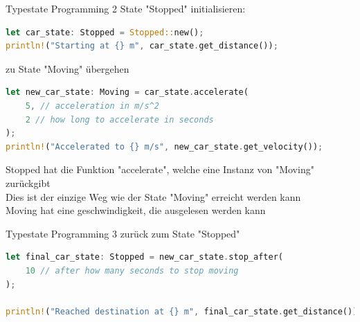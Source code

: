 \begin{frame}[fragile,t]{Typestate Programming 2}
    State "Stopped" initialisieren:
    \begin{lstlisting}[language=Rust,escapechar=@,label={lst:typestate-programming-2-1}]
let car_state: Stopped = Stopped::new();
println!("Starting at {} m", car_state.get_distance());
\end{lstlisting}


    \pause zu State "Moving" übergehen
    \begin{lstlisting}[language=Rust,escapechar=@,label={lst:typestate-programming-2-2}]
let new_car_state: Moving = car_state.accelerate(
    5, // acceleration in m/s^2
    2 // how long to accelerate in seconds
);
println!("Accelerated to {} m/s", new_car_state.get_velocity());
\end{lstlisting}

     {
        Stopped hat die Funktion "accelerate", welche eine Instanz von "Moving" zurückgibt \\
        Dies ist der einzige Weg wie der State "Moving" erreicht werden kann \\
        Moving hat eine geschwindigkeit, die ausgelesen werden kann
    }
\end{frame}



\begin{frame}[fragile,t]{Typestate Programming 3}
    zurück zum State "Stopped"
    \begin{lstlisting}[language=Rust,escapechar=@,label={lst:typestate-programming-3-1}]
let final_car_state: Stopped = new_car_state.stop_after(
    10 // after how many seconds to stop moving
);

println!("Reached destination at {} m", final_car_state.get_distance());
    \end{lstlisting}

\end{frame}
